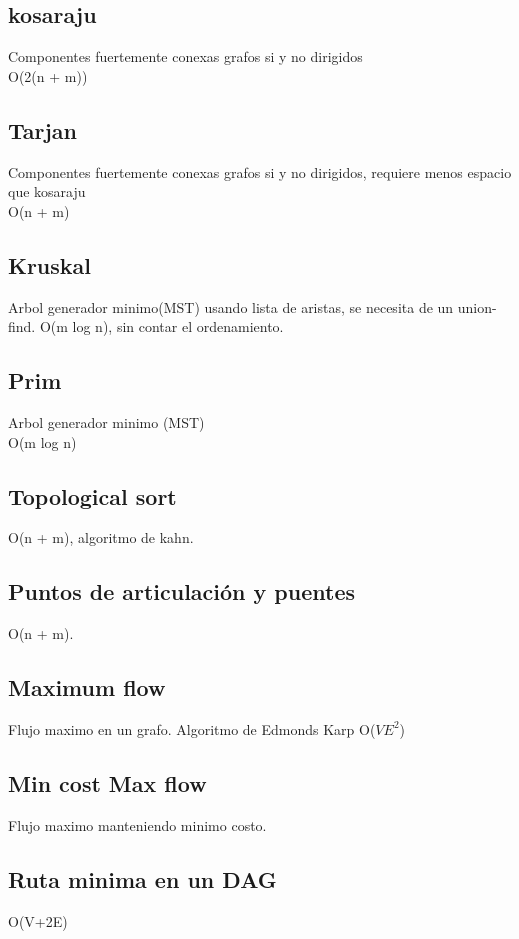 \documentclass[10pt,landscape,twocolumn,a4paper,notitlepage]{article}
\newcommand\cppfile[2][]{

}
\begin{document}
			\subsection{kosaraju}
			Componentes fuertemente conexas grafos si y no dirigidos\\
			O(2(n + m))
			\cppfile[9-36]{grafos/kosaraju.cpp}
			\subsection{Tarjan}
			Componentes fuertemente conexas grafos si y no dirigidos, requiere menos
			espacio que kosaraju\\
			O(n + m)
			\cppfile[9-39]{grafos/tarjan.cpp}
			\subsection{Kruskal}
			Arbol generador minimo(MST) usando lista de aristas, se necesita de un union-find.
			O(m log n), sin contar el ordenamiento.
			\cppfile[38-57]{grafos/kruskal.cpp}
			\subsection{Prim}
			Arbol generador minimo (MST)\\
			O(m log n)
			\cppfile[10-34]{grafos/prim.cpp}
			\subsection{Topological sort}%
			O(n + m), algoritmo de kahn.
			\cppfile[7-26]{grafos/topological_sort_para_grafos_ciclicos.cpp}
			\subsection{Puntos de articulación y puentes}
			O(n + m).
			\cppfile[10-48]{grafos/puntos_de_articulacion_y_puentes.cpp}
			\subsection{Maximum flow}%
			Flujo maximo en un grafo. Algoritmo de Edmonds Karp O(${VE}^{2}$)
			\cppfile[12-53]{grafos/Edmonds_karp.cpp}
			\subsection{Min cost Max flow}
			Flujo maximo manteniendo minimo costo.
			\cppfile[6-59]{grafos/min_cost_max_flow.cpp}
			\subsection{Ruta minima en un DAG}
			O(V+2E)
			\cppfile[12-44]{grafos/ruta_minima_DAG.cpp}
\end{document}
